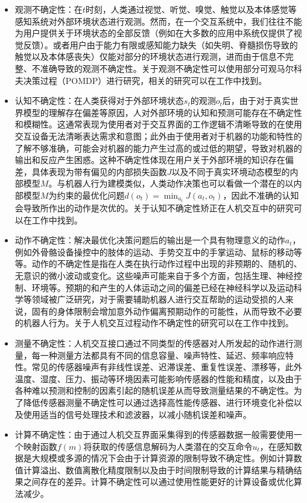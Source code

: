 \begin{itemize}
\item 观测不确定性：在$t$时刻，人类通过视觉、听觉、嗅觉、触觉以及本体感觉等感知系统对外部环境状态进行观测。然而，在一个交互系统中，我们往往不能为用户提供关于环境状态的全部反馈（例如在大多数的应用中系统仅提供了视觉反馈）。或者用户由于能力有限或感知能力缺失（如失明、脊髓损伤导致的触觉以及本体感丧失）仅能对部分的环境状态进行观测，进而由于信息不完整、不准确导致的观测不确定性。关于观测不确定性可以使用部分可观马尔科夫决策过程（POMDP）进行研究，相关的研究可以在工作\cite{torretresolsPOMDPbasedControlHybrid2022,youngPOMDPbasedStatisticalSpoken2012,zhengPOMDPModelLearning2018a}中找到。
\item 认知不确定性：在人类获得对于外部环境状态$s_t$的观测$o_t$后，由于对于真实世界模型的理解存在偏差等原因，人对外部环境的认知和预测可能存在不确定性和模糊性。这通常表现为使用者对于交互界面的工作逻辑不清晰导致的在使用交互设备无法清晰表达需求和意图；此外由于使用者对于机器的功能和特性的了解不够准确，可能会对机器的能力产生过高的或过低的期望，导致对机器的输出和反应产生困惑。这种不确定性体现在用户关于外部环境的知识存在偏差，具体表现为带有偏见的内部损失函数$J$以及不同于真实环境动态模型的内部模型$M$。与机器人行为建模类似，人类动作决策也可以看做一个潜在的以内部模型$M$为约束的最优化问题$d(o_t)=\min_{a_t} J(a_t,o_t)$，因此不准确的认知会导致所作出的动作是次优的。关于认知不确定性矫正在人机交互中的研究可以在工作\cite{gongWhatItYou2020,golubLearningInternalDynamicsa,raffertyInferringLearnersKnowledge,reddyWhereYouThink2018,javdaniSharedAutonomyHindsight2018}中找到。
\item 动作不确定性：解决最优化决策问题后的输出是一个具有物理意义的动作$a_t$，例如外骨骼设备操控中的肢体的运动、手势交互中的手掌运动、鼠标的移动等等。动作的不确定性是指在人类在执行动作过程中出现的非预期的、随机的、无意识的微小波动或变化。这些噪声可能来自于多个方面，包括生理、神经控制、环境等。预期的和产生的人体运动之间的偏差已经在神经科学以及运动科学等领域被广泛研究\cite{vanbeersRoleExecutionNoise2004,faisalNoiseNervousSystem2008,churchlandCentralSourceMovement2006}，对于需要辅助机器人进行交互帮助的运动受损的人来说，固有的身体限制会增加意外动作偏离预期动作的可能性，从而导致不必要的机器人行为。关于人机交互过程动作不确定性的研究可以在工作\cite{gopinathCustomizedHandlingUnintended2021,jainProbabilisticHumanIntent2020}中找到。
\item 测量不确定性：人机交互接口通过不同类型的传感器对人所发起的动作进行测量，每一种测量方法都具有不同的信息容量、噪声特性、延迟、频率响应特性。常见的传感器噪声有非线性误差、迟滞误差、重复性误差、漂移等，此外温度、湿度、压力、振动等环境因素可能影响传感器的性能和精度，以及由于各种难以预测和控制的因素引起的随机误差从而导致测量结果的不确定性。为了降低传感器测量不确定性可以通过选择高性能传感器、进行环境变化补偿以及使用适当的信号处理技术和滤波器，以减小随机误差和噪声。
\item 计算不确定性：由于通过人机交互界面采集得到的传感器数据一般需要使用一个映射函数$f(m)$将获取的传感信息解码为人类潜在的交互命令$u_t$，在感知数据是大规模或多源的情况下会由于计算资源的限制导致不确定性。例如计算数值计算溢出、数值离散化精度限制以及由于时间限制导致的计算结果与精确结果之间存在的差异。计算不确定性可以通过使用性能更好的计算设备或优化算法减少。
\end{itemize}

